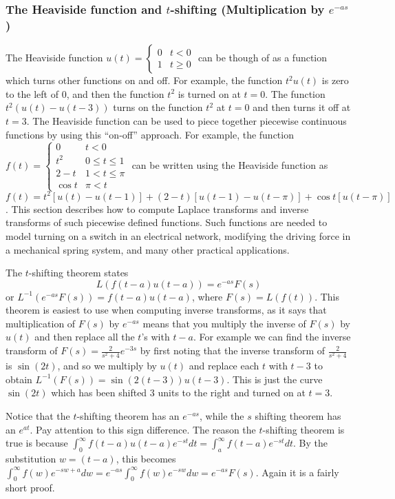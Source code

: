 \subsubsection{The Heaviside function and $t$-shifting  (Multiplication by $e^{-as}$)}
The Heaviside function $u(t) = \begin{cases}0 &t<0 \\ 1 &t\geq 0\end{cases}$ can be though of as a function which turns  other functions on and off.  For example, the function $t^2u(t)$ is zero to the left of $0$, and then the function $t^2$ is turned on at $t=0$.  The function $t^2(u(t)-u(t-3))$ turns on the function $t^2$ at $t=0$ and then turns it off at $t=3$. The Heaviside function can be used to piece together piecewise continuous functions by using this ``on-off'' approach.  For example, the function 
$f(t) = 
\begin{cases}
0 &t<0 \\ 
t^2& 0\leq t\leq 1\\
2-t & 1< t\leq \pi\\
\cos t & \pi< t
\end{cases}$ can be written using the Heaviside function as $f(t) = t^2[u(t)-u(t-1)] + (2-t)[u(t-1)-u(t-\pi)]+\cos t [u(t-\pi)]$.  This section describes how to compute Laplace transforms and inverse transforms of such piecewise defined functions.  Such functions are needed to model turning on a switch in an electrical network, modifying the driving force in a mechanical spring system, and many other practical applications.



The $t$-shifting theorem states $$L(f(t-a)u(t-a))=e^{-as}F(s)$$ or $L^{-1}(e^{-as}F(s)) = f(t-a)u(t-a)$, where $F(s)=L(f(t))$. This theorem is easiest to use when computing inverse transforms, as it says that multiplication of $F(s)$ by $e^{-as}$ means that you multiply the inverse of $F(s)$ by $u(t)$ and then replace all the $t$'s with $t-a$. For example we can find the inverse transform of $F(s) = \frac{2}{s^2+4}e^{-3s}$ by first noting that the inverse transform of $\frac{2}{s^2+4}$ is $\sin(2t)$, and so we multiply by $u(t)$ and replace each $t$ with $t-3$ to obtain $L^{-1}(F(s))=\sin(2(t-3))u(t-3)$. This is just the curve $\sin(2t)$ which has been shifted $3$ units to the right and turned on at $t=3$. 

Notice that the $t$-shifting theorem has an $e^{-as}$, while the $s$ shifting theorem has an $e^{at}$. Pay attention to this sign difference. The reason the $t$-shifting theorem is true is because $\int_0^{\infty}f(t-a)u(t-a)e^{-st}dt = \int_a^\infty f(t-a)e^{-st}dt$. By the substitution $w=(t-a)$, this becomes $\int_0^\infty f(w)e^{-s{w+a}}dw = e^{-as}\int_0^\infty f(w)e^{-sw}dw = e^{-as}F(s)$. Again it is a fairly short proof.

